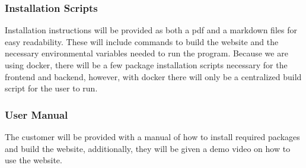 \subsubsection{Installation Scripts}
Installation instructions will be provided as both a pdf and a markdown files for easy readability. These will include commands to build the website and the necessary environmental variables needed to run the program. Because we are using docker, there will be a few package installation scripts necessary for the frontend and backend, however, with docker there will only be a centralized build script for the user to run. 

\subsubsection{User Manual}
The customer will be provided with a manual of how to install required packages and build the website, additionally, they will be given a demo video on how to use the website.
